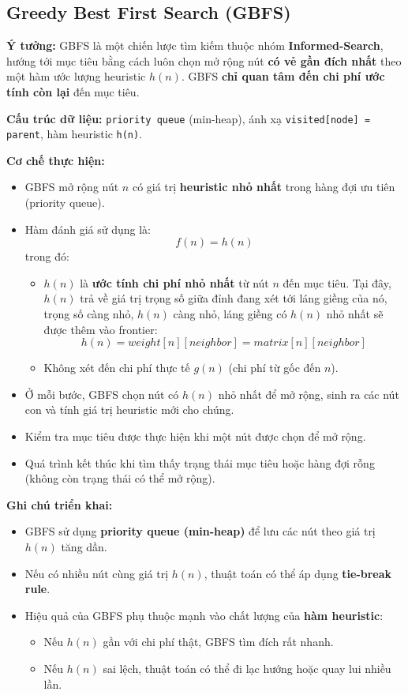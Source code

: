\subsection{Greedy Best First Search (GBFS)}

\textbf{Ý tưởng:} GBFS là một chiến lược tìm kiếm thuộc nhóm \textbf{Informed-Search}, hướng tới mục tiêu bằng cách luôn chọn mở rộng nút \textbf{có vẻ gần đích nhất} theo một hàm ước lượng heuristic $h(n)$. GBFS \textbf{chỉ quan tâm đến chi phí ước tính còn lại} đến mục tiêu. \cite{russell2021}

\textbf{Cấu trúc dữ liệu:} \texttt{priority queue} (min-heap), ánh xạ \texttt{visited[node] = parent}, hàm heuristic \texttt{h(n)}.

\textbf{Cơ chế thực hiện:}
\begin{itemize}
    \item GBFS mở rộng nút $n$ có giá trị \textbf{heuristic nhỏ nhất} trong hàng đợi ưu tiên (priority queue).  
    \item Hàm đánh giá sử dụng là:
    \[
        f(n) = h(n)
    \]
    trong đó:
    \begin{itemize}
        \item $h(n)$ là \textbf{ước tính chi phí nhỏ nhất} từ nút $n$ đến mục tiêu. Tại đây, $h(n)$ trả về giá trị trọng số giữa đỉnh đang xét tới láng giềng của nó, trọng số càng nhỏ, $h(n)$ càng nhỏ, láng giềng có $h(n)$ nhỏ nhất sẽ được thêm vào frontier:
        \[
        h(n) = weight[n][neighbor] = matrix[n][neighbor]
        \]
        \item Không xét đến chi phí thực tế $g(n)$ (chi phí từ gốc đến $n$).
    \end{itemize}
    \item Ở mỗi bước, GBFS chọn nút có $h(n)$ nhỏ nhất để mở rộng, sinh ra các nút con và tính giá trị heuristic mới cho chúng.
    \item Kiểm tra mục tiêu được thực hiện khi một nút được chọn để mở rộng.
    \item Quá trình kết thúc khi tìm thấy trạng thái mục tiêu hoặc hàng đợi rỗng (không còn trạng thái có thể mở rộng).
\end{itemize}

\textbf{Ghi chú triển khai:}
\begin{itemize}
    \item GBFS sử dụng \textbf{priority queue (min-heap)} để lưu các nút theo giá trị $h(n)$ tăng dần.
    \item Nếu có nhiều nút cùng giá trị $h(n)$, thuật toán có thể áp dụng \textbf{tie-break rule}.
    \item Hiệu quả của GBFS phụ thuộc mạnh vào chất lượng của \textbf{hàm heuristic}: 
    \begin{itemize}
        \item Nếu $h(n)$ gần với chi phí thật, GBFS tìm đích rất nhanh.
        \item Nếu $h(n)$ sai lệch, thuật toán có thể đi lạc hướng hoặc quay lui nhiều lần.
    \end{itemize}
\end{itemize}

